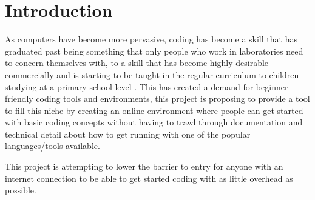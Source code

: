 \chapter{Introduction}

As computers have become more pervasive, coding has become a skill that has graduated past being something that only people who work in laboratories need to concern themselves with, to a skill that has become highly desirable commercially and is starting to be taught in the regular curriculum to children studying at a primary school level \cite{schools}. This has created a demand for beginner friendly coding tools and environments, this project is proposing to provide a tool to fill this niche by creating an online environment where people can get started with basic coding concepts without having to trawl through documentation and technical detail about how to get running with one of the popular languages/tools available.

This project is attempting to lower the barrier to entry for anyone with an internet connection to be able to get started coding with as little overhead as possible.

\pagebreak
